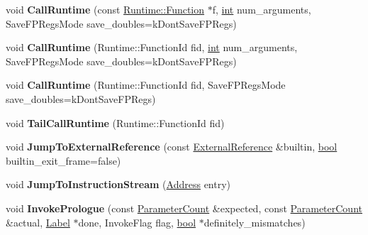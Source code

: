 \begin{DoxyCompactItemize}
void {\bfseries Call\+Runtime} (const \mbox{\hyperlink{structv8_1_1internal_1_1Runtime_1_1Function}{Runtime\+::\+Function}} $\ast$f, \mbox{\hyperlink{classint}{int}} num\+\_\+arguments, Save\+F\+P\+Regs\+Mode save\+\_\+doubles=k\+Dont\+Save\+F\+P\+Regs)
\item 
\mbox{\label{classv8_1_1internal_1_1MacroAssembler_a87a8fd8a93b463d8485753c6d0d0465e}} 
void {\bfseries Call\+Runtime} (Runtime\+::\+Function\+Id fid, \mbox{\hyperlink{classint}{int}} num\+\_\+arguments, Save\+F\+P\+Regs\+Mode save\+\_\+doubles=k\+Dont\+Save\+F\+P\+Regs)
\item 
\mbox{\label{classv8_1_1internal_1_1MacroAssembler_a797b53d578cd762b40c56f4485bf584e}} 
void {\bfseries Call\+Runtime} (Runtime\+::\+Function\+Id fid, Save\+F\+P\+Regs\+Mode save\+\_\+doubles=k\+Dont\+Save\+F\+P\+Regs)
\item 
\mbox{\label{classv8_1_1internal_1_1MacroAssembler_aefb569829758555a7394ce1d34ed2bef}} 
void {\bfseries Tail\+Call\+Runtime} (Runtime\+::\+Function\+Id fid)
\item 
\mbox{\label{classv8_1_1internal_1_1MacroAssembler_a83aa1bd635235afda8a1e96390da9227}} 
void {\bfseries Jump\+To\+External\+Reference} (const \mbox{\hyperlink{classv8_1_1internal_1_1ExternalReference}{External\+Reference}} \&builtin, \mbox{\hyperlink{classbool}{bool}} builtin\+\_\+exit\+\_\+frame=false)
\item 
\mbox{\label{classv8_1_1internal_1_1MacroAssembler_a18fc118dd1ecc3b59755acce49880671}} 
void {\bfseries Jump\+To\+Instruction\+Stream} (\mbox{\hyperlink{classuintptr__t}{Address}} entry)
\item 
\mbox{\label{classv8_1_1internal_1_1MacroAssembler_a90d693fdf50ed30e96c06dad101120a2}} 
void {\bfseries Invoke\+Prologue} (const \mbox{\hyperlink{classv8_1_1internal_1_1ParameterCount}{Parameter\+Count}} \&expected, const \mbox{\hyperlink{classv8_1_1internal_1_1ParameterCount}{Parameter\+Count}} \&actual, \mbox{\hyperlink{classv8_1_1internal_1_1Label}{Label}} $\ast$done, Invoke\+Flag flag, \mbox{\hyperlink{classbool}{bool}} $\ast$definitely\+\_\+mismatches)

\end{DoxyCompactItemize}
